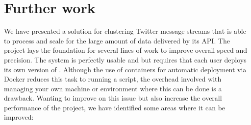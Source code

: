 \chapter{Further work}
\label{sec:furtherwork}

We have presented a solution for clustering Twitter message streams that is able to process and scale for the large amount of data delivered by its API. The project lays the foundation for several lines of work to improve overall speed and precision. 
The system is perfectly usable and but requires that each user deploys its own version of {\project}. Although the use of containers for automatic deployment via Docker reduces this task to running a script, the overhead involved with managing your own machine or environment where this can be done is a drawback. Wanting to improve on this issue but also increase the overall performance of the project, we have identified some areas where it can be improved:
